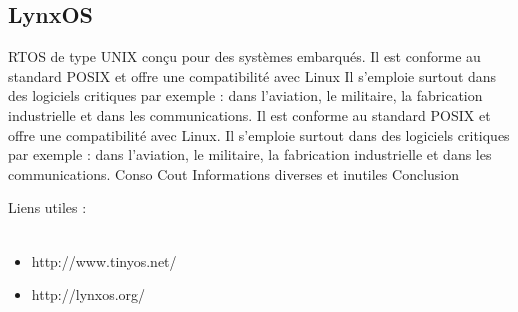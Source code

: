 		\subsection{LynxOS}
		 
{RTOS de type UNIX conçu pour des systèmes embarqués. Il est conforme au standard POSIX et offre une compatibilité avec Linux}
{Il s'emploie surtout dans des logiciels critiques par exemple : dans l'aviation, le militaire, la fabrication industrielle et dans les communications.
Il est conforme au standard POSIX et offre une compatibilité avec Linux. Il s'emploie surtout dans des logiciels critiques par exemple : dans l'aviation, le militaire, la fabrication industrielle et dans les communications.}
{Conso}
{Cout}
{Informations diverses et inutiles}
{Conclusion}




Liens utiles : \\~
\begin {itemize}
	\item http://www.tinyos.net/
	\item http://lynxos.org/
\end {itemize}

